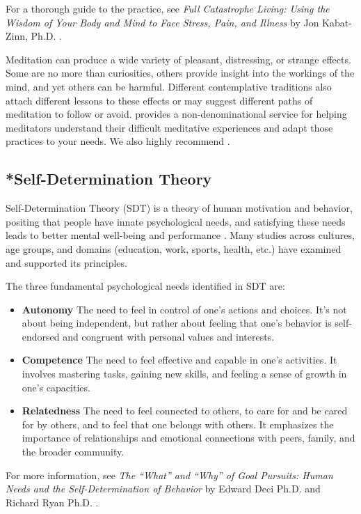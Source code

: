 \documentclass[12pt,letterpaper]{book}
\begin{document}
For a thorough guide to the practice, see \textit{Full Catastrophe Living: Using the Wisdom of Your Body and Mind to Face Stress, Pain, and Illness} by Jon Kabat-Zinn, Ph.D. \cite{kabat-zinnMBSR}.

Meditation can produce a wide variety of pleasant, distressing, or strange effects. Some are no more than curiosities, others provide insight into the workings of the mind, and yet others can be harmful. Different contemplative traditions also attach different lessons to these effects or may suggest different paths of meditation to follow or avoid. \textcite{cheetahHouse} provides a non-denominational service for helping meditators understand their difficult meditative experiences and adapt those practices to your needs. We also highly recommend \textcite{treleaven2018trauma}.
\subsection{*Self-Determination Theory}
\label{sec:sdt}
Self-Determination Theory (SDT) is a theory of human motivation and behavior, positing that people have innate psychological needs, and satisfying these needs leads to better mental well-being and performance \cite{deciSDT}. Many studies across cultures, age groups, and domains (education, work, sports, health, etc.) have examined and supported its principles.

The three fundamental psychological needs identified in SDT are:
\begin{itemize}
    \item \textbf{Autonomy} The need to feel in control of one's actions and choices. It's not about being independent, but rather about feeling that one's behavior is self-endorsed and congruent with personal values and interests.
    \item \textbf{Competence} The need to feel effective and capable in one's activities. It involves mastering tasks, gaining new skills, and feeling a sense of growth in one's capacities.
    \item \textbf{Relatedness} The need to feel connected to others, to care for and be cared for by others, and to feel that one belongs with others. It emphasizes the importance of relationships and emotional connections with peers, family, and the broader community.
\end{itemize}
For more information, see \textit{The “What” and “Why” of Goal Pursuits: Human Needs and the Self-Determination of Behavior} by Edward Deci Ph.D. and Richard Ryan Ph.D. \cite{deciSDT}.
\end{document}
